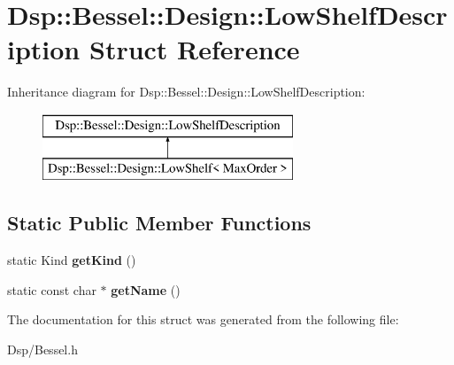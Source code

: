 \hypertarget{structDsp_1_1Bessel_1_1Design_1_1LowShelfDescription}{\section{Dsp\-:\-:Bessel\-:\-:Design\-:\-:Low\-Shelf\-Description Struct Reference}
\label{structDsp_1_1Bessel_1_1Design_1_1LowShelfDescription}
}
Inheritance diagram for Dsp\-:\-:Bessel\-:\-:Design\-:\-:Low\-Shelf\-Description\-:\begin{figure}[H]
\begin{center}
\leavevmode
\includegraphics[height=2.000000cm]{structDsp_1_1Bessel_1_1Design_1_1LowShelfDescription}
\end{center}
\end{figure}
\subsection*{Static Public Member Functions}
\begin{DoxyCompactItemize}
\item 
\hypertarget{structDsp_1_1Bessel_1_1Design_1_1LowShelfDescription_a4590952bd7576d56d3123e687d5b9a0c}{static Kind {\bfseries get\-Kind} ()}\label{structDsp_1_1Bessel_1_1Design_1_1LowShelfDescription_a4590952bd7576d56d3123e687d5b9a0c}

\item 
\hypertarget{structDsp_1_1Bessel_1_1Design_1_1LowShelfDescription_a878e153826b2def5eaf95cc183704dd8}{static const char $\ast$ {\bfseries get\-Name} ()}\label{structDsp_1_1Bessel_1_1Design_1_1LowShelfDescription_a878e153826b2def5eaf95cc183704dd8}

\end{DoxyCompactItemize}


The documentation for this struct was generated from the following file\-:\begin{DoxyCompactItemize}
\item 
Dsp/Bessel.\-h\end{DoxyCompactItemize}
